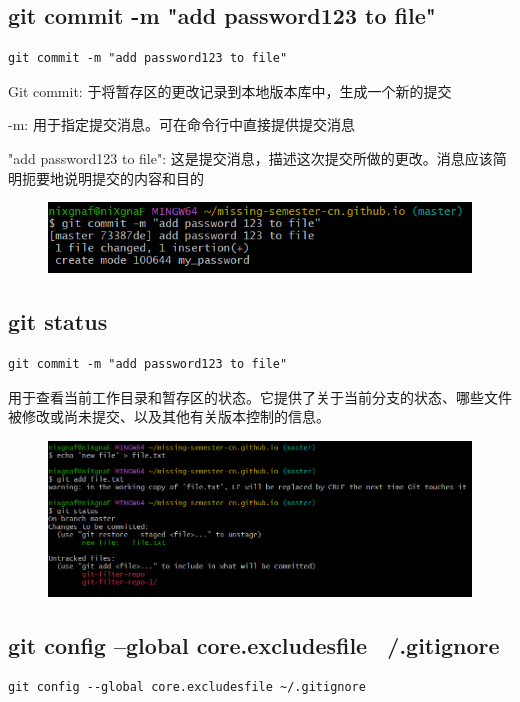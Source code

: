 \documentclass{article}
\begin{document}
\subsection{git commit -m "add password123 to file"}
\lstset{language=bash}
\begin{lstlisting}
git commit -m "add password123 to file"
\end{lstlisting}

\noindent Git commit: 于将暂存区的更改记录到本地版本库中，生成一个新的提交

\noindent -m: 用于指定提交消息。可在命令行中直接提供提交消息

\noindent "add password123 to file": 这是提交消息，描述这次提交所做的更改。消息应该简明扼要地说明提交的内容和目的
\begin{figure}[h]
    \centering
    \includegraphics[width=1\linewidth]{picture/gitcommit.png}
\end{figure}

\subsection{git status}
\begin{lstlisting}
git commit -m "add password123 to file"
\end{lstlisting}

\noindent 用于查看当前工作目录和暂存区的状态。它提供了关于当前分支的状态、哪些文件被修改或尚未提交、以及其他有关版本控制的信息。
\begin{figure}[h]
    \centering
    \includegraphics[width=1\linewidth]{picture/gitstatus.png}
\end{figure}


\subsection{git config --global core.excludesfile ~/.gitignore}
\begin{lstlisting}
git config --global core.excludesfile ~/.gitignore
\end{lstlisting}
\end{document}
